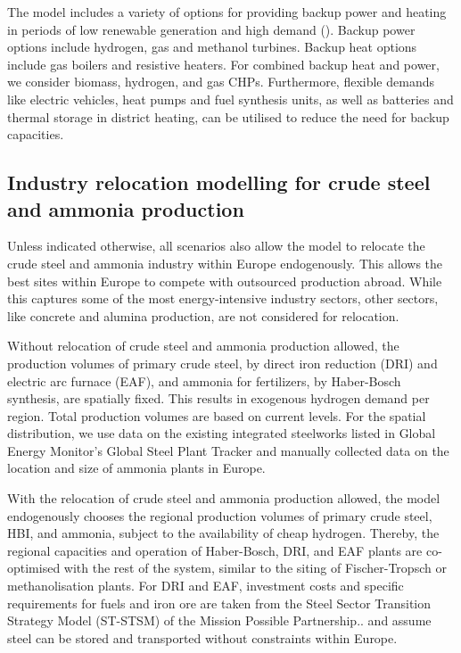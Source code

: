 The model includes a variety of options for providing backup power and heating
in periods of low renewable generation and high demand
(). Backup power options include
hydrogen, gas and methanol turbines. Backup heat options include gas boilers and
resistive heaters. For combined backup heat and power, we consider biomass,
hydrogen, and gas CHPs. Furthermore, flexible demands like electric vehicles,
heat pumps and fuel synthesis units, as well as batteries and thermal storage in
district heating, can be utilised to reduce the need for backup capacities.

\subsection*{Industry relocation modelling for crude steel and ammonia production}
\label{sec:methods-industry}

Unless indicated otherwise, all scenarios also allow the model to relocate the
crude steel and ammonia industry within Europe endogenously. This allows the best
sites within Europe to compete with outsourced production abroad. While this
captures some of the most energy-intensive industry sectors, other sectors, like
concrete and alumina production, are not considered for relocation.

Without relocation of crude steel and ammonia production allowed, the production
volumes of primary crude steel, by direct iron reduction (DRI) and electric arc
furnace (EAF), and ammonia for fertilizers, by Haber-Bosch synthesis, are
spatially fixed. This results in exogenous hydrogen demand per region. Total
production volumes are based on current
levels.\cite{unitedstatesgeologicalsurveyAmmoniaProductionCountry2022,europeancommission.jointresearchcentre.JRCIDEES2021IntegratedDatabase2024}
For the spatial distribution, we use data on the existing integrated steelworks
listed in Global Energy Monitor's Global Steel Plant Tracker
\cite{globalenergymonitorGlobalSteelPlant2024} and manually collected data on
the location and size of ammonia plants in Europe.

With the relocation of crude steel and ammonia production allowed, the model
endogenously chooses the regional production volumes of primary crude steel, HBI, and
ammonia, subject to the availability of cheap hydrogen. Thereby, the regional
capacities and operation of Haber-Bosch, DRI, and EAF plants are co-optimised
with the rest of the system, similar to the siting of Fischer-Tropsch or
methanolisation plants. For DRI and EAF, investment costs and specific
requirements for fuels and iron ore are taken from the Steel Sector Transition
Strategy Model (ST-STSM) of the Mission Possible
Partnership.\cite{missionpossiblepartnershipSteelSectorTransition2022,missionpossiblepartnershipMakingNetZeroSteel2022}.
and assume steel can be stored and transported without constraints within
Europe.

